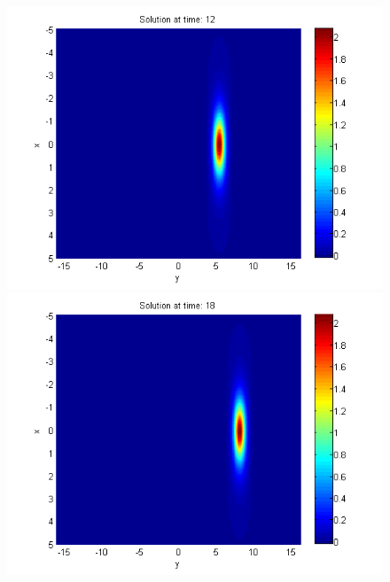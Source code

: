 \documentclass{article}
\begin{document}
\begin{figure}[ht]
\begin{minipage}[b]{0.32\linewidth}
		 \includegraphics[width=\linewidth]{../amitans/figures/solution_30x45_bt3_c045_T12.png}
	\end{minipage}
	\begin{minipage}[b]{0.32\linewidth}
		\includegraphics[width=\linewidth]{../amitans/figures/solution_30x45_bt3_c045_T18.png}
	\end{minipage}	
	\begin{minipage}[b]{0.32\linewidth}

\end{minipage}
\end{figure}
\end{document}
